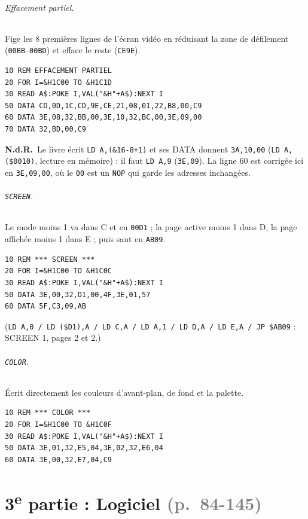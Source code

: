 \documentclass[a4paper,10pt]{article}
\newcommand{\hex}[1]{\texttt{#1}}
\newcommand{\pg}[1]{\texorpdfstring{\textcolor{gray}{\small(p.~#1)}}{}}
\newcommand{\nota}[1]{\textcolor{red!60!black}{\small\textbf{N.d.R.}~#1}}
\begin{document}
\paragraph{Effacement partiel.} Fige les 8 premières lignes de l'écran
vidéo en réduisant la zone de défilement (\hex{00BB}--\hex{00BD}) et efface
le reste (\hex{CE9E}).
\begin{verbatim}
10 REM EFFACEMENT PARTIEL
20 FOR I=&H1C00 TO &H1C1D
30 READ A$:POKE I,VAL("&H"+A$):NEXT I
50 DATA CD,0D,1C,CD,9E,CE,21,08,01,22,B8,00,C9
60 DATA 3E,08,32,BB,00,3E,10,32,BC,00,3E,09,00
70 DATA 32,BD,00,C9
\end{verbatim}
\nota{Le livre écrit \texttt{LD A,(\&16-8+1)} et ses DATA donnent
\texttt{3A,10,00} (\texttt{LD A,(\$0010)}, lecture en mémoire) : il faut
\texttt{LD A,9} (\texttt{3E,09}). La ligne 60 est corrigée ici en
\texttt{3E,09,00}, où le \texttt{00} est un \texttt{NOP} qui garde les
adresses inchangées.}

\paragraph{\texttt{SCREEN}.} Le mode moins 1 va dans C et en \hex{00D1} ;
la page active moins 1 dans D, la page affichée moins 1 dans E ; puis saut en
\hex{AB09}.
\begin{verbatim}
10 REM *** SCREEN ***
20 FOR I=&H1C00 TO &H1C0C
30 READ A$:POKE I,VAL("&H"+A$):NEXT I
50 DATA 3E,00,32,D1,00,4F,3E,01,57
60 DATA 5F,C3,09,AB
\end{verbatim}
(\texttt{LD A,0 / LD (\$D1),A / LD C,A / LD A,1 / LD D,A / LD E,A /
JP \$AB09} : SCREEN 1, pages 2 et 2.)

\paragraph{\texttt{COLOR}.} Écrit directement les couleurs d'avant-plan, de
fond et la palette.
\begin{verbatim}
10 REM *** COLOR ***
20 FOR I=&H1C00 TO &H1C0F
30 READ A$:POKE I,VAL("&H"+A$):NEXT I
50 DATA 3E,01,32,E5,04,3E,02,32,E6,04
60 DATA 3E,00,32,E7,04,C9
\end{verbatim}

\part*{3\textsuperscript{e} partie : Logiciel \pg{84-145}}
\end{document}
